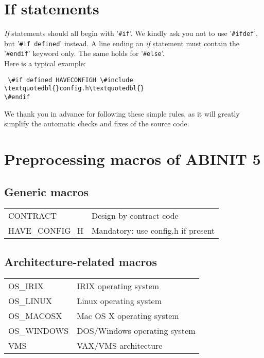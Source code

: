 \section{If statements}

\textit{If} statements should all begin with '\texttt{\#if}'. We kindly
ask you not to use '\texttt{\#ifdef}', but \hbox{'\texttt{\#if defined}'}
instead. A line ending an \textit{if} statement must contain the '\texttt{\#endif}'
keyword only. The same holds for '\texttt{\#else}'. \\


Here is a typical example:

{\small \begin{verbatim} \#if defined HAVECONFIGH \#include \textquotedbl{}config.h\textquotedbl{}
\#endif \end{verbatim} }{\small \par}

We thank you in advance for following these simple rules, as it will
greatly simplify the automatic checks and fixes of the source code.


\section{Preprocessing macros of ABINIT 5}


\subsection{Generic macros}

\begin{center}
\begin{tabular}{ll}
CONTRACT  & Design-by-contract code \tabularnewline
HAVE\_CONFIG\_H  & Mandatory: use config.h if present \tabularnewline
\end{tabular}
\par\end{center}


\subsection{Architecture-related macros}

\begin{center}
\begin{tabular}{ll}
OS\_IRIX  & IRIX operating system \tabularnewline
OS\_LINUX  & Linux operating system \tabularnewline
OS\_MACOSX  & Mac OS X operating system \tabularnewline
OS\_WINDOWS  & DOS/Windows operating system \tabularnewline
VMS  & VAX/VMS architecture \tabularnewline
\end{tabular}
\par\end{center}


